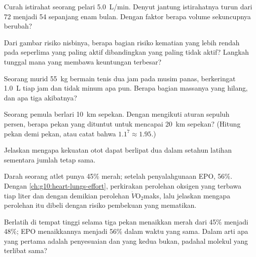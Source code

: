 \begin{exercise}[$\star\star$]\label{exo:g10:sport-and-health:7}
Curah istirahat seorang pelari \qty{5.0}{L/min}. Denyut jantung
istirahatnya turun dari 72 menjadi 54 sepanjang enam bulan. Dengan
faktor berapa volume sekuncupnya berubah?
\end{exercise}

\begin{exercise}[$\star\star$]\label{exo:g10:sport-and-health:8}
Dari gambar risiko nisbinya, berapa bagian risiko kematian yang lebih
rendah pada seperlima yang paling aktif dibandingkan yang paling tidak
aktif? Langkah tunggal mana yang membawa keuntungan terbesar?
\end{exercise}

\begin{exercise}[$\star\star$]\label{exo:g10:sport-and-health:9}
Seorang murid \qty{55}{kg} bermain tenis dua jam pada musim panas,
berkeringat \qty{1.0}{L} tiap jam dan tidak minum apa pun. Berapa
bagian massanya yang hilang, dan apa tiga akibatnya?
\end{exercise}

\begin{exercise}[$\star\star$]\label{exo:g10:sport-and-health:10}
Seorang pemula berlari \qty{10}{km} sepekan. Dengan mengikuti aturan
sepuluh persen, berapa pekan yang dituntut untuk mencapai \qty{20}{km}
sepekan? (Hitung pekan demi pekan, atau catat bahwa $1.1^7 \approx 1.95$.)
\end{exercise}

\begin{exercise}[$\star\star$]\label{exo:g10:sport-and-health:11}
Jelaskan mengapa kekuatan otot dapat berlipat dua dalam setahun latihan
sementara jumlah  tetap sama.
\end{exercise}

\begin{exercise}[$\star\star\star$]\label{exo:g10:sport-and-health:12}
Darah seorang atlet punya 45\%  merah; setelah penyalahgunaan EPO,
56\%. Dengan \cref{ch:g10:heart-lungs-effort}, perkirakan perolehan
oksigen yang terbawa tiap liter dan dengan demikian perolehan
$\dot V\!\mathrm{O_2}$maks, lalu jelaskan mengapa perolehan itu dibeli
dengan risiko pembekuan yang mematikan.
\end{exercise}

\begin{exercise}[$\star\star\star$]\label{exo:g10:sport-and-health:13}
Berlatih di tempat tinggi selama tiga pekan menaikkan  merah dari
45\% menjadi 48\%; EPO menaikkannya menjadi 56\% dalam waktu yang sama.
Dalam arti apa yang pertama adalah penyesuaian dan yang kedua bukan,
padahal molekul yang terlibat sama?
\end{exercise}

